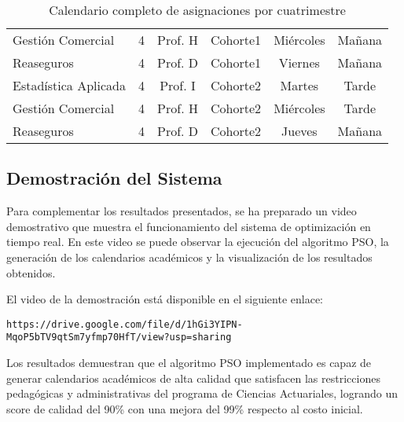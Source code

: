 \begin{table}[htbp]
\begin{tabular}{|p{3cm}|c|c|c|c|c|}
Gestión Comercial & 4 & Prof. H & Cohorte1 & Miércoles & Mañana \\
Reaseguros & 4 & Prof. D & Cohorte1 & Viernes & Mañana \\
Estadística Aplicada & 4 & Prof. I & Cohorte2 & Martes & Tarde \\
Gestión Comercial & 4 & Prof. H & Cohorte2 & Miércoles & Tarde \\
Reaseguros & 4 & Prof. D & Cohorte2 & Jueves & Mañana \\
\hline
\end{tabular}
\caption{Calendario completo de asignaciones por cuatrimestre}
\label{tab:calendario_completo}
\end{table}

\subsection{Demostración del Sistema}

Para complementar los resultados presentados, se ha preparado un video demostrativo que muestra el funcionamiento del sistema de optimización en tiempo real. En este video se puede observar la ejecución del algoritmo PSO, la generación de los calendarios académicos y la visualización de los resultados obtenidos.

El video de la demostración está disponible en el siguiente enlace:

\texttt{https://drive.google.com/file/d/1hGi3YIPN-MqoP5bTV9qtSm7yfmp70HfT/view?usp=sharing}

Los resultados demuestran que el algoritmo PSO implementado es capaz de generar calendarios académicos de alta calidad que satisfacen las restricciones pedagógicas y administrativas del programa de Ciencias Actuariales, logrando un score de calidad del 90\% con una mejora del 99\% respecto al costo inicial.

